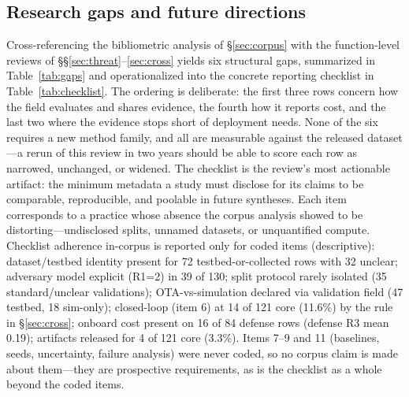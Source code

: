 \documentclass[10.5pt,compsoc,winfonts]{ICN}
\begin{document}
\subsection{Research gaps and future directions}
\label{sec:gaps}
Cross-referencing the bibliometric analysis of \S\ref{sec:corpus} with the function-level reviews of \S\S\ref{sec:threat}–\ref{sec:cross} yields six structural gaps, summarized in Table~\ref{tab:gaps} and operationalized into the concrete reporting checklist in Table~\ref{tab:checklist}. The ordering is deliberate: the first three rows concern how the field evaluates and shares evidence, the fourth how it reports cost, and the last two where the evidence stops short of deployment needs. None of the six requires a new method family, and all are measurable against the released dataset—a rerun of this review in two years should be able to score each row as narrowed, unchanged, or widened. The checklist is the review's most actionable artifact: the minimum metadata a study must disclose for its claims to be comparable, reproducible, and poolable in future syntheses. Each item corresponds to a practice whose absence the corpus analysis showed to be distorting—undisclosed splits, unnamed datasets, or unquantified compute. Checklist adherence in-corpus is reported only for coded items (descriptive): dataset/testbed identity present for 72 testbed-or-collected rows with 32 unclear; adversary model explicit (R1=2) in 39 of 130; split protocol rarely isolated (35 standard/unclear validations); OTA-vs-simulation declared via validation field (47 testbed, 18 sim-only); closed-loop (item 6) at 14 of 121 core (11.6\%) by the rule in \S\ref{sec:cross}; onboard cost present on 16 of 84 defense rows (defense R3 mean 0.19); artifacts released for 4 of 121 core (3.3\%). Items 7–9 and 11 (baselines, seeds, uncertainty, failure analysis) were never coded, so no corpus claim is made about them—they are prospective requirements, as is the checklist as a whole beyond the coded items.
\end{document}

